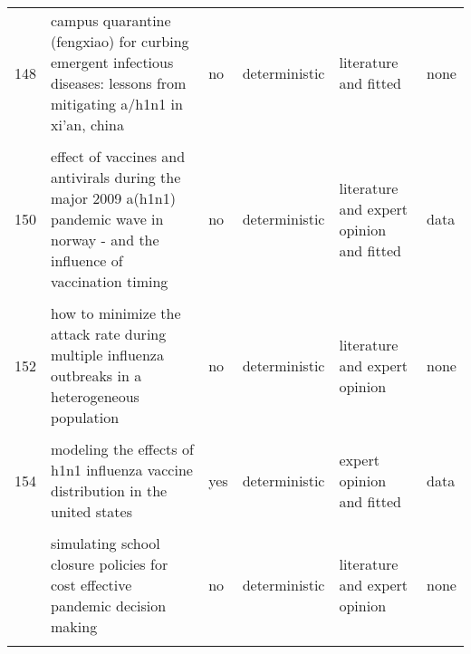 \documentclass[
]{article}
\begin{document}
\begin{landscape}
\begin{longtable}{l>{\raggedright\arraybackslash}p{3cm}l>{\raggedright\arraybackslash}p{3cm}ll}
148 & campus quarantine (fengxiao) for curbing emergent infectious diseases: lessons from mitigating a/h1n1 in xi'an, china & no & deterministic & literature and fitted & none\\
\cellcolor{gray!6}{149} & \cellcolor{gray!6}{dynamic modelling of costs and health consequences of school closure during an influenza pandemic} & \cellcolor{gray!6}{no} & \cellcolor{gray!6}{deterministic} & \cellcolor{gray!6}{literature} & \cellcolor{gray!6}{none}\\
150 & effect of vaccines and antivirals during the major 2009 a(h1n1) pandemic wave in norway - and the influence of vaccination timing & no & deterministic & literature and expert opinion and fitted & data\\
\addlinespace
\cellcolor{gray!6}{151} & \cellcolor{gray!6}{estimating the value of containment strategies in delaying the arrival time of an influenza pandemic: a case study of travel restriction and patient isolation} & \cellcolor{gray!6}{yes} & \cellcolor{gray!6}{stochastic} & \cellcolor{gray!6}{expert opinion} & \cellcolor{gray!6}{none}\\
152 & how to minimize the attack rate during multiple influenza outbreaks in a heterogeneous population & no & deterministic & literature and expert opinion & none\\
\cellcolor{gray!6}{153} & \cellcolor{gray!6}{modeling strategies for controlling h1n1 outbreaks in china} & \cellcolor{gray!6}{no} & \cellcolor{gray!6}{deterministic} & \cellcolor{gray!6}{literature and fitted} & \cellcolor{gray!6}{none}\\
154 & modeling the effects of h1n1 influenza vaccine distribution in the united states & yes & deterministic & expert opinion and fitted & data\\
\cellcolor{gray!6}{155} & \cellcolor{gray!6}{modeling the impact of air, sea, and land travel restrictions supplemented by other interventions on the emergence of a new influenza pandemic virus} & \cellcolor{gray!6}{yes} & \cellcolor{gray!6}{stochastic} & \cellcolor{gray!6}{literature and fitted} & \cellcolor{gray!6}{none}\\
\addlinespace
156 & simulating school closure policies for cost effective pandemic decision making & no & deterministic & literature and expert opinion & none\\
\cellcolor{gray!6}{157} & \cellcolor{gray!6}{the impact of school closures on pandemic influenza: assessing potential repercussions using a seasonal sir model} & \cellcolor{gray!6}{no} & \cellcolor{gray!6}{deterministic} & \cellcolor{gray!6}{literature and expert opinion} & \cellcolor{gray!6}{none}\\

\end{longtable}
\end{landscape}
\end{document}
